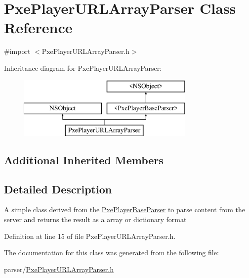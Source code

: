 \hypertarget{interface_pxe_player_u_r_l_array_parser}{\section{Pxe\-Player\-U\-R\-L\-Array\-Parser Class Reference}
\label{interface_pxe_player_u_r_l_array_parser}
}


{\ttfamily \#import $<$Pxe\-Player\-U\-R\-L\-Array\-Parser.\-h$>$}

Inheritance diagram for Pxe\-Player\-U\-R\-L\-Array\-Parser\-:\begin{figure}[H]
\begin{center}
\leavevmode
\includegraphics[height=3.000000cm]{interface_pxe_player_u_r_l_array_parser}
\end{center}
\end{figure}
\subsection*{Additional Inherited Members}


\subsection{Detailed Description}
A simple class derived from the \hyperlink{protocol_pxe_player_base_parser-p}{Pxe\-Player\-Base\-Parser} to parse content from the server and returns the result as a array or dictionary format 

Definition at line 15 of file Pxe\-Player\-U\-R\-L\-Array\-Parser.\-h.



The documentation for this class was generated from the following file\-:\begin{DoxyCompactItemize}
\item 
parser/\hyperlink{_pxe_player_u_r_l_array_parser_8h}{Pxe\-Player\-U\-R\-L\-Array\-Parser.\-h}\end{DoxyCompactItemize}
